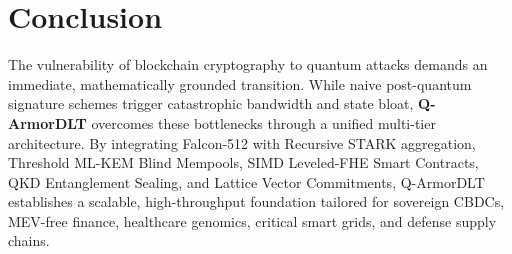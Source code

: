 \documentclass[runningheads]{llncs}
\begin{document}
\section{Conclusion}
The vulnerability of blockchain cryptography to quantum attacks demands an immediate, mathematically grounded transition. While naive post-quantum signature schemes trigger catastrophic bandwidth and state bloat, \textbf{Q-ArmorDLT} overcomes these bottlenecks through a unified multi-tier architecture. By integrating Falcon-512 with Recursive STARK aggregation, Threshold ML-KEM Blind Mempools, SIMD Leveled-FHE Smart Contracts, QKD Entanglement Sealing, and Lattice Vector Commitments, Q-ArmorDLT establishes a scalable, high-throughput foundation tailored for sovereign CBDCs, MEV-free finance, healthcare genomics, critical smart grids, and defense supply chains.
\end{document}
